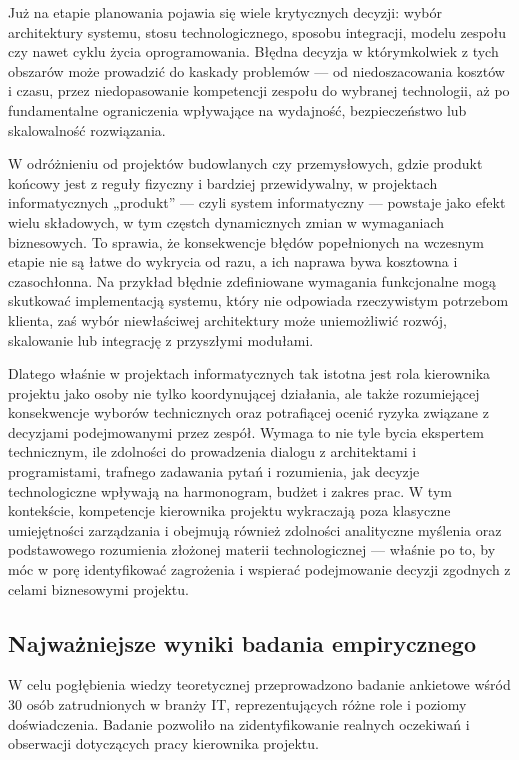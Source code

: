 Już na etapie planowania pojawia się wiele krytycznych decyzji: wybór architektury systemu, stosu technologicznego, sposobu integracji, modelu zespołu czy nawet cyklu życia oprogramowania. Błędna decyzja w którymkolwiek z tych obszarów może prowadzić do kaskady problemów — od niedoszacowania kosztów i czasu, przez niedopasowanie kompetencji zespołu do wybranej technologii, aż po fundamentalne ograniczenia wpływające na wydajność, bezpieczeństwo lub skalowalność rozwiązania.

W odróżnieniu od projektów budowlanych czy przemysłowych, gdzie produkt końcowy jest z reguły fizyczny i bardziej przewidywalny, w projektach informatycznych „produkt” — czyli system informatyczny — powstaje jako efekt wielu składowych, w tym częstch dynamicznych zmian w wymaganiach biznesowych. To sprawia, że konsekwencje błędów popełnionych na wczesnym etapie nie są łatwe do wykrycia od razu, a ich naprawa bywa kosztowna i czasochłonna. Na przykład błędnie zdefiniowane wymagania funkcjonalne mogą skutkować implementacją systemu, który nie odpowiada rzeczywistym potrzebom klienta, zaś wybór niewłaściwej architektury może uniemożliwić rozwój, skalowanie lub integrację z przyszłymi modułami.

Dlatego właśnie w projektach informatycznych tak istotna jest rola kierownika projektu jako osoby nie tylko koordynującej działania, ale także rozumiejącej konsekwencje wyborów technicznych oraz potrafiącej ocenić ryzyka związane z decyzjami podejmowanymi przez zespół. Wymaga to nie tyle bycia ekspertem technicznym, ile zdolności do prowadzenia dialogu z architektami i programistami, trafnego zadawania pytań i rozumienia, jak decyzje technologiczne wpływają na harmonogram, budżet i zakres prac. W tym kontekście, kompetencje kierownika projektu wykraczają poza klasyczne umiejętności zarządzania i obejmują również zdolności analityczne myślenia oraz podstawowego rozumienia złożonej materii technologicznej — właśnie po to, by móc w porę identyfikować zagrożenia i wspierać podejmowanie decyzji zgodnych z celami biznesowymi projektu.


\subsection{Najważniejsze wyniki badania empirycznego}

W celu pogłębienia wiedzy teoretycznej przeprowadzono badanie ankietowe wśród 30 osób zatrudnionych w branży IT, reprezentujących różne role i poziomy doświadczenia. Badanie pozwoliło na zidentyfikowanie realnych oczekiwań i obserwacji dotyczących pracy kierownika projektu.

